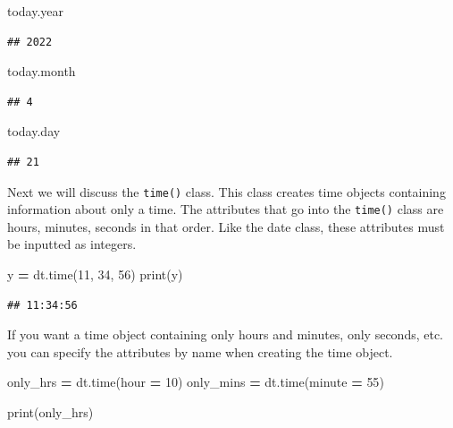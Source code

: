 \documentclass[
]{book}
\newenvironment{Shaded}{\begin{snugshade}}{\end{snugshade}}
\newcommand{\BuiltInTok}[1]{#1}
\newcommand{\DecValTok}[1]{\textcolor[rgb]{0.00,0.00,0.81}{#1}}
\newcommand{\NormalTok}[1]{#1}
\newcommand{\OperatorTok}[1]{\textcolor[rgb]{0.81,0.36,0.00}{\textbf{#1}}}
\begin{document}
\begin{Shaded}
\begin{Highlighting}[]
\NormalTok{today.year }
\end{Highlighting}
\end{Shaded}

\begin{verbatim}
## 2022
\end{verbatim}

\begin{Shaded}
\begin{Highlighting}[]
\NormalTok{today.month}
\end{Highlighting}
\end{Shaded}

\begin{verbatim}
## 4
\end{verbatim}

\begin{Shaded}
\begin{Highlighting}[]
\NormalTok{today.day}
\end{Highlighting}
\end{Shaded}

\begin{verbatim}
## 21
\end{verbatim}

Next we will discuss the \texttt{time()} class. This class creates time objects containing information about only a time. The attributes that go into the \texttt{time()} class are hours, minutes, seconds in that order. Like the date class, these attributes must be inputted as integers.

\begin{Shaded}
\begin{Highlighting}[]
\NormalTok{y }\OperatorTok{=}\NormalTok{ dt.time(}\DecValTok{11}\NormalTok{, }\DecValTok{34}\NormalTok{, }\DecValTok{56}\NormalTok{)}
\BuiltInTok{print}\NormalTok{(y)}
\end{Highlighting}
\end{Shaded}

\begin{verbatim}
## 11:34:56
\end{verbatim}

If you want a time object containing only hours and minutes, only seconds, etc. you can specify the attributes by name when creating the time object.

\begin{Shaded}
\begin{Highlighting}[]
\NormalTok{only\_hrs }\OperatorTok{=}\NormalTok{ dt.time(hour }\OperatorTok{=} \DecValTok{10}\NormalTok{)}
\NormalTok{only\_mins }\OperatorTok{=}\NormalTok{ dt.time(minute }\OperatorTok{=} \DecValTok{55}\NormalTok{)}

\BuiltInTok{print}\NormalTok{(only\_hrs)}
\end{Highlighting}
\end{Shaded}
\end{document}
